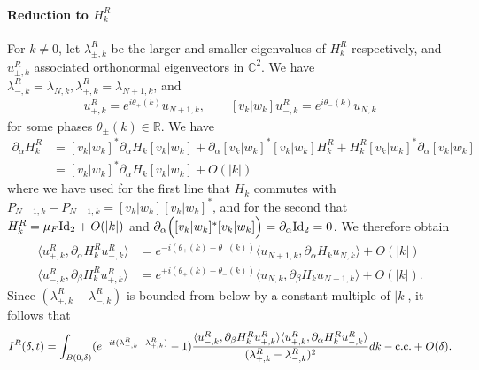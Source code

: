 \documentclass[a4paper,11pt]{article}
\theoremstyle{plain}
\theoremstyle{remark}
\def\R{{\mathbb R}}
\def\C{{\mathbb C}}
\begin{document}
\paragraph{Reduction to $H_k^{R}$}
For $k \neq 0$, let $\lambda^{R}_{\pm,k}$ be the larger and smaller
eigenvalues of $H_k^{R}$ respectively, and $u^{R}_{\pm,k}$
associated orthonormal eigenvectors in $\C^2$. We have
$\lambda_{-,k}^{R} = \lambda_{N,k}, \lambda_{+,k}^{R} =
\lambda_{N+1,k}$, and
\begin{align*}
  [v_{k} | w_{k}]
u_{+,k}^{R} = e^{i\theta_{+}(k)}u_{N + 1,k},\qquad[v_{k} | w_{k}]
u_{-,k}^{R} = e^{i\theta_{-}(k)}u_{N,k}
\end{align*}
for some phases $\theta_{\pm}(k) \in \R$. We have
\begin{align*}
  \partial_\alpha H_k^{R}
  &= [v_{k} | w_{k}]^{*}
\partial_\alpha H_k[v_{k} | w_{k}]+ \partial_\alpha [v_{k} | w_{k}]^{*} [v_{k} | w_{k}] H_k^{R} + H_k^{R}  [v_{k} | w_{k}]^{*}\partial_\alpha [v_{k} | w_{k}]
\\
&= [v_{k} | w_{k}]^{*}
\partial_\alpha H_k[v_{k} | w_{k}] + O(|k|)
\end{align*}
where we have used for the first line that $H_k$ commutes with
$P_{N+1,k} - P_{N-1,k} = [v_{k} | w_{k}]
[v_{k} | w_{k}]^{*}$, and for the second that $H_k^{R} = \mu_{F} {\rm Id}_{2} + O(|k|)$ and
$\partial_\alpha \Big([v_{k} | w_{k}]^{*} [v_{k} | w_{k}] \Big) =
\partial_\alpha {\rm Id}_{2} = 0$. We therefore obtain
\begin{align*}
  \langle u^{R}_{+,k},\partial_\alpha H_k^{R}u^{R}_{-,k}\rangle&= e^{-i(\theta_{+}(k)-\theta_{-}(k))}\langle u_{N+1,k},\partial_\alpha H_ku_{N,k}\rangle + O(|k|)\\
  \langle u^{R}_{-,k}, \partial_\beta H_k^{R} u^{R}_{+,k} \rangle&= e^{+i(\theta_{+}(k)-\theta_{-}(k))}\langle u_{N,k},\partial_\beta H_ku_{N+1,k}\rangle + O(|k|).
\end{align*}
Since $(\lambda^{R}_{+,k} - \lambda^{R}_{-,k})$ is bounded from below
by a constant multiple of $|k|$, it follows that
\begin{equation}
  \label{eq:IRdt}
  I^{R}(\delta,t) = \int_{B(0,\delta)} (e^{-i t (\lambda^{R}_{-,k} - \lambda^{R}_{+,k})} - 1)\frac{\langle u^{R}_{-,k}, \partial_\beta H_k^{R} u^{R}_{+,k} \rangle\langle u^{R}_{+,k},\partial_\alpha H_k^{R}u^{R}_{-,k}\rangle}{(\lambda^{R}_{+,k} - \lambda^{R}_{-,k})^{2}}dk - {\rm c.c.} + O(\delta).
\end{equation}
\end{document}
